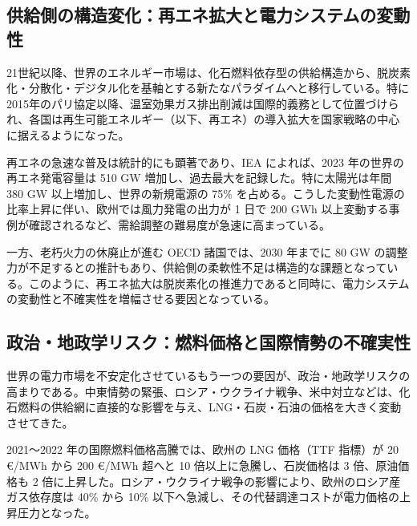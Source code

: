 \subsection{供給側の構造変化：再エネ拡大と電力システムの変動性}

21世紀以降、世界のエネルギー市場は、化石燃料依存型の供給構造から、脱炭素化・分散化・デジタル化を基軸とする新たなパラダイムへと移行している。特に2015年のパリ協定以降、温室効果ガス排出削減は国際的義務として位置づけられ、各国は再生可能エネルギー（以下、再エネ）の導入拡大を国家戦略の中心に据えるようになった\parencite{IEA2021NetZero,UNFCCC2015Paris}。

再エネの急速な普及は統計的にも顕著であり、IEA によれば、2023 年の世界の再エネ発電容量は 510 GW 増加し、過去最大を記録した。特に太陽光は年間 380 GW 以上増加し、世界の新規電源の 75\% を占める\parencite{IEA2023Renewables}。こうした変動性電源の比率上昇に伴い、欧州では風力発電の出力が 1 日で 200 GWh 以上変動する事例が確認されるなど、需給調整の難易度が急速に高まっている\parencite{IEA2023Electricity}。

一方、老朽火力の休廃止が進む OECD 諸国では、2030 年までに 80 GW の調整力が不足するとの推計もあり、供給側の柔軟性不足は構造的な課題となっている\parencite{OECD2022Security}。このように、再エネ拡大は脱炭素化の推進力であると同時に、電力システムの変動性と不確実性を増幅させる要因となっている。

\subsection{政治・地政学リスク：燃料価格と国際情勢の不確実性}

世界の電力市場を不安定化させているもう一つの要因が、政治・地政学リスクの高まりである。中東情勢の緊張、ロシア・ウクライナ戦争、米中対立などは、化石燃料の供給網に直接的な影響を与え、LNG・石炭・石油の価格を大きく変動させてきた。

2021〜2022 年の国際燃料価格高騰では、欧州の LNG 価格（TTF 指標）が 20 €/MWh から 200 €/MWh 超へと 10 倍以上に急騰し、石炭価格は 3 倍、原油価格も 2 倍に上昇した\parencite{IEA2022GasMarket}。ロシア・ウクライナ戦争の影響により、欧州のロシア産ガス依存度は 40\% から 10\% 以下へ急減し、その代替調達コストが電力価格の上昇圧力となった。

